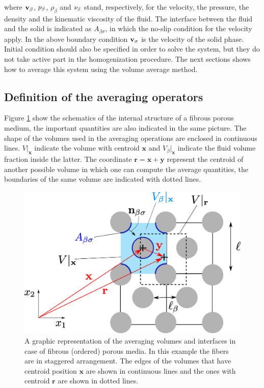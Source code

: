 where $\textbf{v}_{\beta}$, $p_{\beta}$, $\rho_{\beta}$ and $\nu_{\beta}$ stand, respectively, for  the velocity, the pressure, the density and the kinematic viscosity of the fluid.
The interface between the fluid and the solid is indicated as $A_{\beta\sigma}$, in which the no-slip condition for the velocity apply.
In the above boundary condition $\textbf{v}_{\sigma}$ is the velocity of the solid phase.
Initial condition should also be specified in order to solve the system, but they do not take active part in the homogenization procedure.
The next sections shows how to average this system using the volume average method.

\subsection{Definition of the averaging operators}
Figure \ref{fig:rev} show the schematics of the internal structure of a fibrous porous medium, the important quantities are also indicated in the same picture.
The shape of the volumes used in the averaging operations are enclosed in continuous lines. $V|_{\mathbf{x}}$ indicate the volume with centroid $\mathbf{x}$ and $V_{\beta}|_{\mathbf{x}}$ indicate the fluid volume fraction inside the latter.
The coordinate $\mathbf{r} = \mathbf{x} +\mathbf{y}$ represent the centroid of another possible volume in which one can compute the average quantities, the boundaries of the same volume are indicated with dotted lines.

\begin{figure}[h!]
	\centering
	\includegraphics[width=0.7\linewidth]{chapter_2/figure/REV}
	\caption{A graphic representation of the averaging volumes and interfaces in case of fibrous (ordered) porous media. In this example the fibers are in staggered arrangement. The edges of the volumes that have centroid position $\mathbf{x}$ are shown in continuous lines and the ones with centroid $\mathbf{r}$ are shown in dotted lines.}
	\label{fig:rev}
\end{figure}

